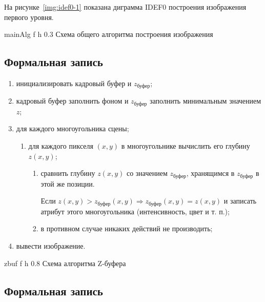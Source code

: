 На рисунке~\ref{img:idef0-1} показана диграмма IDEF0 построения изображения первого уровня.

	{mainAlg} %
	{f} %
	{h} %
	{0.3\textwidth} %
	{Схема общего алгоритма построения изображения} %

\subsection{Формальная запись}
\begin{enumerate}
	\item инициализировать кадровый буфер и $z_{\text{буфер}}$;
	\item кадровый буфер заполнить фоном и $z_{\text{буфер}}$ заполнить  минимальным значением $z$;
	\item для каждого многоугольника сцены;
	\begin{enumerate}[label=\arabic{enumi}.\arabic*]
		\item  для каждого пикселя $(x, y)$ в многоугольнике вычислить его глубину $z(x, y)$;
		\begin{enumerate}
			\item  сравнить глубину $z(x, y)$ со значением  $z_{\text{буфер}}$, хранящимся в $z_{\text{буфер}}$ в этой же позиции. 
			
			Если  $z(x, y) > z_{\text{буфер}}(x, y) \Rightarrow z_{\text{буфер}}(x, y) = z(x, y) $ и записать атрибут этого многоугольника (интенсивность, цвет и т. п.);
			
			\item в противном случае никаких действий не производить;
		\end{enumerate}
	\end{enumerate}
	
	\item вывести изображение.
\end{enumerate}

\clearpage

\fi 


	{zbuf} %
	{f} %
	{h} %
	{0.8\textwidth} %
	{Схема алгоритма Z-буфера} %
\clearpage


\subsection{Формальная запись}

